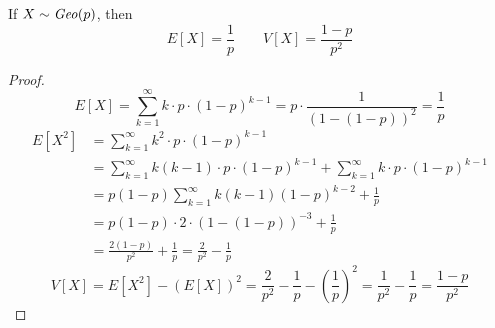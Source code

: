 \begin{theorem}
    If $X \sim \text{\emph{Geo}}(p)$, then
    \[ E[X] = \frac{1}{p} \qquad V[X] = \frac{1-p}{p^2} \]
\end{theorem}
\begin{proof}
    \[ E[X] = \sum_{k = 1}^\infty k \cdot p \cdot (1-p)^{k - 1}
            = p \cdot \frac{1}{(1 - ( 1 - p))^2}
            = \frac{1}{p}                                                    \]
    \begin{align*}
        E[X^2] &= \sum_{k = 1}^\infty k^2 \cdot p \cdot (1 - p)^{k - 1}      \\
               &= \sum_{k = 1}^\infty k(k - 1) \cdot p \cdot (1 - p)^{k - 1} +
                  \sum_{k = 1}^\infty k \cdot p \cdot (1 - p)^{k - 1}        \\
               &= p(1 - p) \sum_{k = 1}^\infty k(k - 1)(1 - p)^{k - 2} +
                  \frac{1}{p}                                                \\
               &= p(1 - p) \cdot 2 \cdot (1 - (1 - p))^{-3} + \frac{1}{p}    \\
               &= \frac{2(1-p)}{p^2} + \frac{1}{p}                           
                = \frac{2}{p^2} - \frac{1}{p}
    \end{align*}
    \[ V[X] = E[X^2] - (E[X])^2
            = \frac{2}{p^2} - \frac{1}{p} - (\frac{1}{p})^2
            = \frac{1}{p^2} - \frac{1}{p}
            = \frac{1 - p}{p^2}                                              \]
\end{proof}

